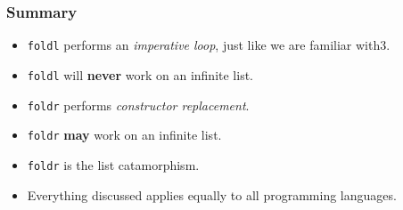 \begin{frame}
\frametitle{Summary}

\begin{itemize}
\item \lstinline[basicstyle=\ttfamily]$foldl$ performs an \emph{imperative loop}, just like we are familiar with3.
\item \lstinline[basicstyle=\ttfamily]$foldl$ will \textbf{never} work on an infinite list.
\item \lstinline[basicstyle=\ttfamily]$foldr$ performs \emph{constructor replacement}.
\item \lstinline[basicstyle=\ttfamily]$foldr$ \textbf{may} work on an infinite list.
\item \lstinline[basicstyle=\ttfamily]$foldr$ is the list catamorphism.
\item Everything discussed applies equally to all programming languages.
\end{itemize}

\end{frame}
